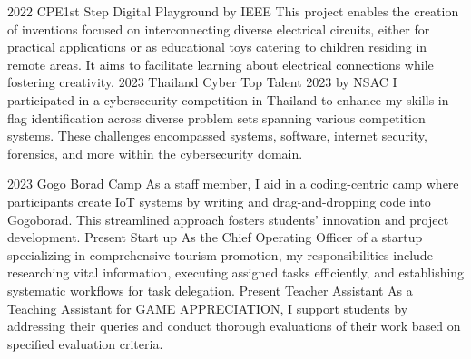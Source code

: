 \documentclass[9pt]{developercv} %
\begin{document}
\vspace{ 5 pt}
\begin{entrylist}
        \entry
        {2022}
        {CPE1st Step Digital Playground by IEEE}
        {}
        {This project enables the creation of inventions focused on interconnecting diverse electrical circuits, either for practical applications or as educational toys catering to children residing in remote areas. It aims to facilitate learning about electrical connections while fostering creativity.}
        \entry
        {2023}
        {Thailand Cyber Top Talent 2023 by NSAC}
        {}
        {I participated in a cybersecurity competition in Thailand to enhance my skills in flag identification across diverse problem sets spanning various competition systems. These challenges encompassed systems, software, internet security, forensics, and more within the cybersecurity domain.}
\end{entrylist}

\vspace{-10pt}
\begin{entrylist}
    \entry
        {2023}
        {Gogo Borad Camp}
        {}
        {As a staff member, I aid in a coding-centric camp where participants create IoT systems by writing and drag-and-dropping code into Gogoborad. This streamlined approach fosters students' innovation and project development.}
    \entry
        {Present}
        {Start up}
        {}
        {As the Chief Operating Officer of a startup specializing in comprehensive tourism promotion, my responsibilities include researching vital information, executing assigned tasks efficiently, and establishing systematic workflows for task delegation.}
    \entry
        {Present}
        {Teacher Assistant}
        {}
        {As a Teaching Assistant for GAME APPRECIATION, I support students by addressing their queries and conduct thorough evaluations of their work based on specified evaluation criteria.}
\end{entrylist}
\end{document}

